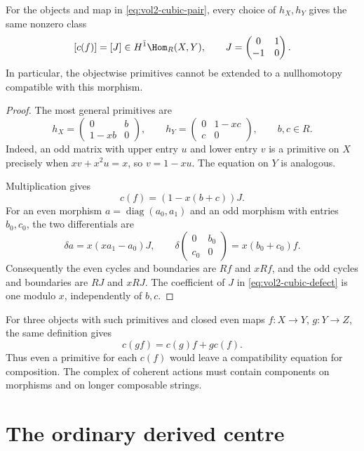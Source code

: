\begin{proposition}\label{prop:vol2-cubic-defect}
For the objects and map in \eqref{eq:vol2-cubic-pair}, every choice
of $h_X,h_Y$ gives the same nonzero class
\[
 [c(f)]=[J]\in H^{\bar1}\Hom_R(X,Y),
 \qquad J=\begin{pmatrix}0&1\\-1&0\end{pmatrix}.
\]
In particular, the objectwise primitives cannot be extended to a
nullhomotopy compatible with this morphism.
\end{proposition}

\begin{proof}
The most general primitives are
\[
 h_X=\begin{pmatrix}0&b\\1-xb&0\end{pmatrix},
 \qquad
 h_Y=\begin{pmatrix}0&1-xc\\c&0\end{pmatrix},
 \qquad b,c\in R.
\]
Indeed, an odd matrix with upper entry $u$ and lower entry $v$
is a primitive on $X$ precisely when $xv+x^2u=x$, so
$v=1-xu$. The equation on $Y$ is analogous.

Multiplication gives
\begin{equation}\label{eq:vol2-cubic-defect}
 c(f)=(1-x(b+c))J.
\end{equation}
For an even morphism $a=\operatorname{diag}(a_0,a_1)$ and an odd
morphism with entries $b_0,c_0$, the two differentials are
\[
 \delta a=x(xa_1-a_0)J,
 \qquad
 \delta\begin{pmatrix}0&b_0\\c_0&0\end{pmatrix}
       =x(b_0+c_0)f.
\]
Consequently the even cycles and boundaries are $Rf$ and $xRf$,
and the odd cycles and boundaries are $RJ$ and $xRJ$.
The coefficient of $J$ in \eqref{eq:vol2-cubic-defect} is one
modulo $x$, independently of $b,c$.
\end{proof}

For three objects with such primitives and closed even maps
$f:X\to Y$, $g:Y\to Z$, the same definition gives
\[
 c(gf)=c(g)f+gc(f).
\]
Thus even a primitive for each $c(f)$ would leave a compatibility
equation for composition. The complex of coherent actions must contain
components on morphisms and on longer composable strings.

\section{The ordinary derived centre}
\label{sec:vol2-ordinary-centre}

